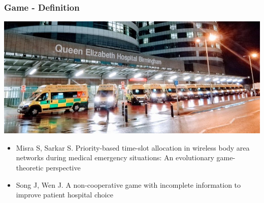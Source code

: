 \begin{frame}
    \frametitle{Game - Definition}

    \includegraphics[scale=0.45]{Bin/ambulance_queue.jpg}

    \pause
    \footnotesize
    \begin{itemize}
        \item Misra S, Sarkar S. Priority-based time-slot allocation in wireless body area networks during medical emergency situations: An evolutionary game-theoretic perspective
        \item Song J, Wen J. A non-cooperative game with incomplete information to improve patient hospital choice
    \end{itemize}
\end{frame}

